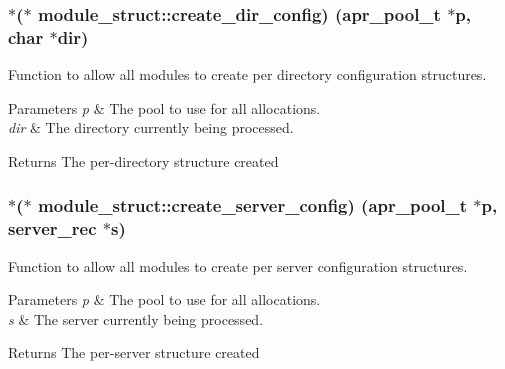 \subsubsection[{\texorpdfstring{create\+\_\+dir\+\_\+config}{create_dir_config}}]{$\ast$($\ast$ module\+\_\+struct\+::create\+\_\+dir\+\_\+config) ({\bf apr\+\_\+pool\+\_\+t} $\ast${\bf p}, char $\ast${\bf dir})}\hypertarget{structmodule__struct_ae3ea1f05d13c0d1e7f7e1fa3a34edf1c}{}\label{structmodule__struct_ae3ea1f05d13c0d1e7f7e1fa3a34edf1c}
Function to allow all modules to create per directory configuration structures. 
\begin{DoxyParams}{Parameters}
{\em p} & The pool to use for all allocations. \\
\hline
{\em dir} & The directory currently being processed. \\
\hline
\end{DoxyParams}
\begin{DoxyReturn}{Returns}
The per-\/directory structure created 
\end{DoxyReturn}
\subsubsection[{\texorpdfstring{create\+\_\+server\+\_\+config}{create_server_config}}]{$\ast$($\ast$ module\+\_\+struct\+::create\+\_\+server\+\_\+config) ({\bf apr\+\_\+pool\+\_\+t} $\ast${\bf p}, {\bf server\+\_\+rec} $\ast${\bf s})}\hypertarget{structmodule__struct_a486e6f27e4b1d885fd4ea21f22b38a68}{}\label{structmodule__struct_a486e6f27e4b1d885fd4ea21f22b38a68}
Function to allow all modules to create per server configuration structures. 
\begin{DoxyParams}{Parameters}
{\em p} & The pool to use for all allocations. \\
\hline
{\em s} & The server currently being processed. \\
\hline
\end{DoxyParams}
\begin{DoxyReturn}{Returns}
The per-\/server structure created 
\end{DoxyReturn}
